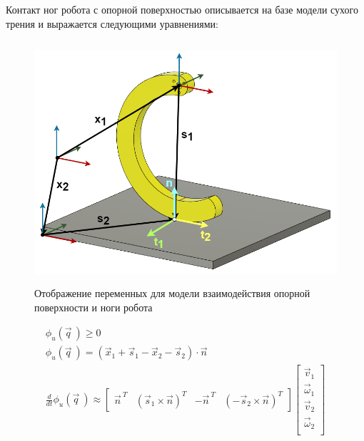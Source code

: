 Контакт ног робота с опорной поверхностью  описывается на базе модели сухого трения и выражается следующими уравнениями:

\begin{figure}[H]
    \centering\includegraphics[height=9cm,width=1\textwidth,keepaspectratio]{images/contact_interaction.png}
    \caption{Отображение переменных для модели взаимодействия опорной поверхности и ноги робота}
    \label{fig:contact_interaction.png}
\end{figure}

\begin{align}
    \label{eq:contact_inter}
    \phi_u(\vec{q}\ ) \geqslant 0 \\ 
                        \phi_u(\vec{q}\ ) = (\vec{x}_1 + \vec{s}_1 - \vec{x}_2 - \vec{s}_2) \cdot \vec{n} \\
                        \frac{d }{d t}\phi_u(\vec{q}\ ) \approx \begin{bmatrix}
                            \vec{n}^{\ T} & (\vec{s}_1 \times \vec{n})^T & -\vec{n}^{\ T} & (-\vec{s}_2 \times \vec{n})^T
                        \end{bmatrix} \begin{bmatrix}
                            \vec{v}_1\\ 
                        \vec{\omega}_1\\ 
                        \vec{v}_2\\
                        \vec{\omega}_2\\
                        \end{bmatrix}
\end{align} 

